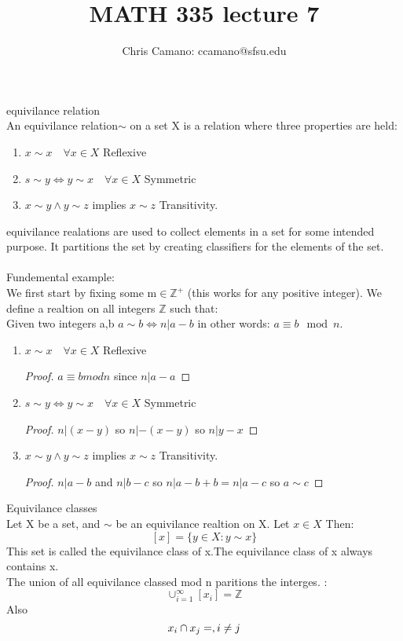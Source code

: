 \documentclass[11pt]{article}
\author{Chris Camano: ccamano@sfsu.edu}
\title{MATH 335  lecture 7 }
\date
\theoremstyle{definition}  %
\newcommand{\Z}{\mathbb{Z}}
\begin{document}
\maketitle
{} equivilance relation\\
An equivilance relation$\sim$ on a set X is a relation where three properties are held:
\begin{enumerate}
  \item $x \sim x \quad \forall x\in X$ Reflexive
  \item $s\sim y \iff y\sim x \quad \forall x \in X$ Symmetric
  \item $x\sim y \land y\sim z $ implies $x\sim z $ Transitivity.
\end{enumerate}
equivilance realations are used to collect elements in a set for some intended purpose. It partitions the set by creating classifiers for the elements of the set. \\\\
Fundemental example:\\

We first start by fixing some m$\in \Z^+$ (this works for any positive integer). We define a realtion on all integers $\Z$ such that: \\
Given two integers a,b $a\sim b \iff n |a-b$ in other words: $a \equiv b \mod n $.

\begin{enumerate}
  \item $x \sim x \quad \forall x\in X$ Reflexive
  \begin{proof}
    $a\equiv b mod n$ since $n|a-a$
  \end{proof}
  \item $s\sim y \iff y\sim x \quad \forall x \in X$ Symmetric
  \begin{proof}
    $n|(x-y)$ so $n|-(x-y)$ so $n|y-x$
  \end{proof}
  \item $x\sim y \land y\sim z $ implies $x\sim z $
   Transitivity.
   \begin{proof}
     $n|a-b$ and $n|b-c$ so $n|a-b+b=n|a-c$ so $a\sim c$
   \end{proof}
\end{enumerate}
 Equivilance classes\\
Let X be a set, and $\sim$ be an equivilance realtion on X. Let $x\in X$ Then:
\[
  [x]=\{y\in X: y\sim x\}
\]
This set is called the equivilance class of x.The equivilance class of x always contains x.
\\
The union of all equivilance classed mod n paritions the interges. :
\[
  \cup_{i=1}^\infty[x_i]=\Z
\]
Also \[
  x_i\cap x_j=\empty , i\neq j
\]
\end{document}
